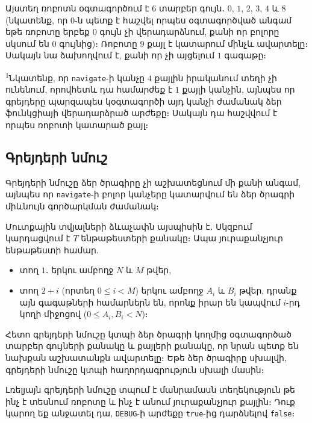 \documentclass[12pt]{article}
\begin{document}
Այստեղ ռոբոտն օգտագործում է $6$ տարբեր գույն․ $0$, $1$, $2$, $3$, $4$ և $8$ (նկատենք, որ $0$-ն պետք է հաշվել որպես օգտագործված անգամ եթե ռոբոտը երբեք $0$ գույն չի վերադարձնում, քանի որ բոլորը սկսում են $0$ գույնից)։ Ռոբոտը $9$ քայլ է կատարում մինչև ավարտելը։ Սակայն նա ձախողվում է, քանի որ չի այցելում $1$ գագաթը։

\textsuperscript{1}Նկատենք, որ \texttt{navigate}-ի կանչը $4$ քայլին իրականում տեղի չի ունենում, որովհետև դա համարժեք է  $1$ քայլի կանչին, այնպես որ գրեյդերը պարզապես կօգտագործի այդ կանչի ժամանակ ձեր ֆունկցիայի վերադարձրած արժեքը։ Սակայն դա հաշվվում է որպես ռոբոտի կատարած քայլ։

\subsection{Գրեյդերի նմուշ}

Գրեյդերի նմուշը ձեր ծրագիրը չի աշխատեցնում մի քանի անգամ, այնպես որ \texttt{navigate}-ի բոլոր կանչերը կատարվում են ձեր ծրագրի միևնույն գործարկման ժամանակ։

Մուտքային տվյալների ձևաչափն այսպիսին է․ Սկզբում կարդացվում է  $T$ ենթաթեստերի քանակը։ Ապա յուրաքանչյուր ենթաթեստի համար. 
\begin{itemize}
\item տող $1$․ երկու ամբողջ $N$ և $M$ թվեր,
\item տող $2+i$ (որտեղ $0 \leq i < M$) երկու ամբողջ $A_i$ և $B_i$ թվեր, դրանք այն գագաթների համարներն են, որոնք իրար են կապվում $i$-րդ կողի միջոցով ($0 \leq A_i, B_i < N$)։
\end{itemize}

Հետո գրեյդերի նմուշը կտպի ձեր ծրագրի կողմից օգտագործած տարբեր գույների քանակը և քայլերի քանակը, որ նրան պետք են նախքան աշխատանքն ավարտելը։ Եթե ձեր ծրագիրը սխալվի, գրեյդերի նմուշը կտպի հաղորդագրություն սխալի մասին։

Լռելյայն գրեյդերի նմուշը տպում է մանրամասն տեղեկություն թե ինչ է տեսնում ռոբոտը և ինչ է անում յուրաքանչյուր քայլին։ Դուք կարող եք անջատել դա, \texttt{DEBUG}-ի արժեքը \texttt{true}-ից դարձնելով \texttt{false}։
\end{document}
